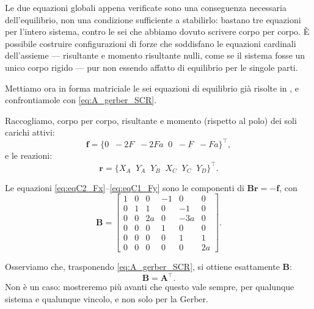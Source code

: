 \begin{oss}
	Le due equazioni globali appena verificate sono una conseguenza
	necessaria dell'equilibrio, non una condizione sufficiente a
	stabilirlo: bastano tre equazioni per l'intero sistema, contro le sei
	che abbiamo dovuto scrivere corpo per corpo. È possibile costruire
	configurazioni di forze che soddisfano le equazioni cardinali
	dell'assieme --- risultante e momento risultante nulli, come se il
	sistema fosse un unico corpo rigido --- pur non essendo affatto di
	equilibrio per le singole parti.
\end{oss}


Mettiamo ora in forma matriciale le sei equazioni di equilibrio già
risolte in , e confrontiamole con \eqref{eq:A_gerber_SCR}.


Raccogliamo, corpo per corpo, risultante e momento (rispetto al polo)
dei soli carichi attivi:
\begin{equation}\label{eq:f_gerber}
	\bm f = \{0\;\; -2F \;\;   -2Fa \;\; 0 \;\; -F \;\; -Fa\}^{\!\top},
\end{equation}
e le reazioni:
\begin{equation}\label{eq:r_gerber}
	\bm r = \{X_A  \;\;  Y_A \;\; Y_B \;\; X_C \;\; Y_C \;\; Y_D\}^{\!\top}.
\end{equation}


Le equazioni \eqref{eq:eqC2_Fx}--\eqref{eq:eqC1_Fy} sono le componenti
di $\bm B\bm r=-\bm f$, con
\begin{equation}\label{eq:B_gerber}
	\bm B = \begin{bmatrix}
		1 & 0 & 0 & -1 & 0  & 0 \\
		0 & 1 & 1 & 0  & -1 & 0 \\
		0 & 0 & 2a& 0  & -3a& 0 \\
		0 & 0 & 0 & 1  & 0  & 0 \\
		0 & 0 & 0 & 0  & 1  & 1 \\
		0 & 0 & 0 & 0  & 0  & 2a
	\end{bmatrix}.
\end{equation}



Osserviamo che, trasponendo \eqref{eq:A_gerber_SCR}, si ottiene esattamente
$\bm B$:
\begin{equation}\label{eq:dualismo_gerber}
	\bm B = \bm A^{\!\top}.
\end{equation}
Non è un caso: mostreremo più avanti che questo vale sempre, per qualunque
sistema e qualunque vincolo, e non solo per la Gerber.


